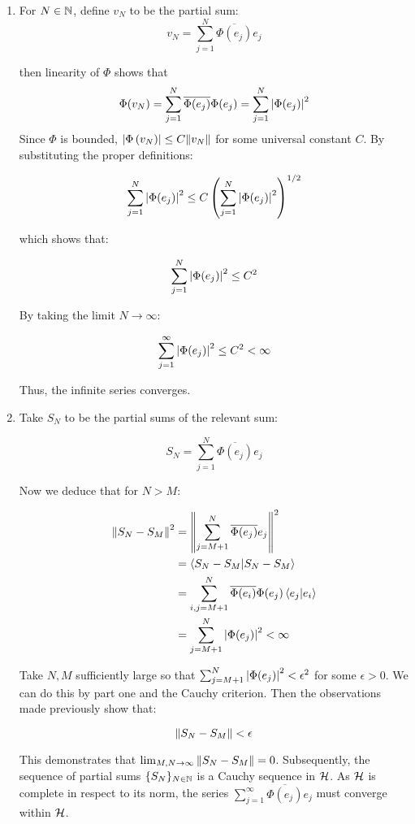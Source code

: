 \documentclass[12pt]{article}%
\newcommand{\normphi}[1][v]{\abs{\Phi\left({#1}
\right)}}
\begin{document}
\begin{enumerate}
  \item For $N \in \mathbb{N}$, define $v_N$ to be the partial sum:
  \[ v_N = \sum_{j =1}^N \overline{\Phi(e_j)} e_j \]

  then linearity of $\Phi$ shows that
  \[ \Phi(v_N) = \sum_{j =1}^N \overline{\Phi(e_j)} \Phi(e_j)  = \sum_{j=1}^N \abs{\Phi(e_j)}^2\]
  Since $\Phi$ is bounded, $\normphi[v_N] \leq C\norm{v_N}$ for some universal constant $C$. By substituting the proper definitions:

  \[\sum_{j=1}^N \abs{\Phi(e_j)}^2 \leq C  \left(\sum_{j=1}^N \abs{\Phi(e_j)}^2 \right)^{1/2} \]

  which shows that:

  \[\sum_{j=1}^N \abs{\Phi(e_j)}^2 \leq C^2  \]

  By taking the limit $N \rightarrow \infty$:

  \[\sum_{j=1}^{\infty} \abs{\Phi(e_j)}^2 \leq C^2 < \infty \]

  Thus, the infinite series converges.

  \item
  Take $S_N$ to be the partial sums of the relevant sum:

  \[S_N = \sum_{j = 1}^N \overline{\Phi(e_j)}e_j \]

  Now we deduce that for $N >M$:

  \begin{align*}
    \norm{S_N - S_M}^2 & = \norm{\sum_{j = M + 1}^N \overline{\Phi(e_j)}e_j}^2 \\
     & =  \ip{S_N - S_M}{S_N - S_M} \\
     & = \sum_{i,j = M+1}^N \overline{\Phi(e_i)}\Phi(e_j) \ip{e_j}{e_i} \\
     & = \sum_{j = M+1}^N \abs{\Phi(e_j)}^2 < \infty
  \end{align*}

  Take $N,M$ sufficiently large so that $\sum_{j = M+1}^N \abs{\Phi(e_j)}^2 < \epsilon^2$ for some $\epsilon > 0$. We can do this by part one and the Cauchy criterion. Then the observations made previously show that:

  \[\norm{S_N - S_M} < \epsilon \]

  This demonstrates that $\lim_{M,N \rightarrow \infty}\norm{S_N - S_M} = 0$. Subsequently, the sequence of partial sums $\{S_N\}_{N \in \mathbb{N}}$ is a Cauchy sequence in $\mathcal{H}$. As $\mathcal{H}$ is complete in respect to its norm, the series $\sum_{j =1}^{\infty}\overline{\Phi(e_j)} e_j$ must converge within $\mathcal{H}$.


\end{enumerate}
\end{document}
